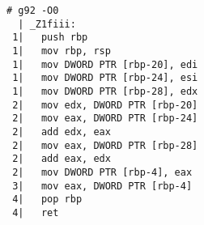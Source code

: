 \begin{lstlisting}[language={},numbers=none,title=\href{https://godbolt.org/z/MaWcP9}{\texttt{godbolt.org/z/MaWcP9}}]
# g92 -O0
  | _Z1fiii:
 1|   push rbp
 1|   mov rbp, rsp
 1|   mov DWORD PTR [rbp-20], edi
 1|   mov DWORD PTR [rbp-24], esi
 1|   mov DWORD PTR [rbp-28], edx
 2|   mov edx, DWORD PTR [rbp-20]
 2|   mov eax, DWORD PTR [rbp-24]
 2|   add edx, eax
 2|   mov eax, DWORD PTR [rbp-28]
 2|   add eax, edx
 2|   mov DWORD PTR [rbp-4], eax
 3|   mov eax, DWORD PTR [rbp-4]
 4|   pop rbp
 4|   ret
\end{lstlisting}
